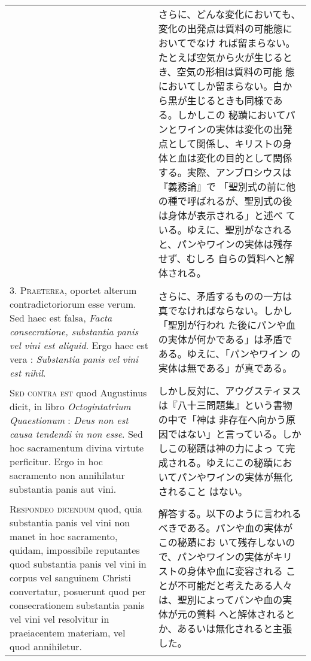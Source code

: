 \documentclass[10pt]{jsarticle} %
\begin{document}
\begin{longtable}{p{21em}p{21em}}
&


さらに、どんな変化においても、変化の出発点は質料の可能態においてでなけ
れば留まらない。たとえば空気から火が生じるとき、空気の形相は質料の可能
態においてしか留まらない。白から黒が生じるときも同様である。しかしこの
秘蹟においてパンとワインの実体は変化の出発点として関係し、キリストの身
体と血は変化の目的として関係する。実際、アンブロシウスは『義務論』で
「聖別式の前に他の種で呼ばれるが、聖別式の後は身体が表示される」と述べ
ている。ゆえに、聖別がなされると、パンやワインの実体は残存せず、むしろ
自らの質料へと解体される。

\\



3. {\scshape Praeterea}, oportet alterum contradictoriorum esse
verum. Sed haec est falsa, {\itshape Facta consecratione, substantia
panis vel vini est aliquid}. Ergo haec est vera : {\itshape Substantia
panis vel vini est nihil}.

&

さらに、矛盾するものの一方は真でなければならない。しかし「聖別が行われ
た後にパンや血の実体が何かである」は矛盾である。ゆえに、「パンやワイン
の実体は無である」が真である。

\\



{\scshape Sed contra est} quod Augustinus dicit, in libro {\itshape
Octogintatrium Quaestionum} : {\itshape Deus non est causa tendendi in
non esse}. Sed hoc sacramentum divina virtute perficitur. Ergo in hoc
sacramento non annihilatur substantia panis aut vini.

&

しかし反対に、アウグスティヌスは『八十三問題集』という書物の中で「神は
非存在へ向かう原因ではない」と言っている。しかしこの秘蹟は神の力によっ
て完成される。ゆえにこの秘蹟においてパンやワインの実体が無化されること
はない。


\\



{\scshape Respondeo dicendum} quod, quia substantia panis vel vini non
manet in hoc sacramento, quidam, impossibile reputantes quod
substantia panis vel vini in corpus vel sanguinem Christi convertatur,
posuerunt quod per consecrationem substantia panis vel vini vel
resolvitur in praeiacentem materiam, vel quod annihiletur.


&

解答する。以下のように言われるべきである。パンや血の実体がこの秘蹟にお
いて残存しないので、パンやワインの実体がキリストの身体や血に変容される
ことが不可能だと考えたある人々は、聖別によってパンや血の実体が元の質料
へと解体されるとか、あるいは無化されると主張した。


\end{longtable}
\end{document}
